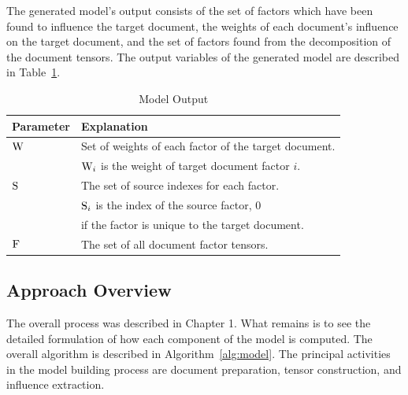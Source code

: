 \documentclass[../ut-dissertation.tex]{subfiles}
\begin{document}
The generated model's output consists of the set of factors which have
been found to influence the target document, the weights of each
document's influence on the target document, and the set of factors
found from the decomposition of the document tensors.  The output variables of
the generated model are described in Table~\ref{table:modelOutput}.
\begin{table}[p]
  \centering
  \caption{Model Output}
  \label{table:modelOutput}

  \begin{tabular}{ll}
    \hline
    Parameter & Explanation\\
    \hline
    $\mathrm{W}$ & Set of weights of each factor of the target document.\\
              & $\mathrm{W}_i$ is the weight of target document factor $i$.\\
    $\mathrm{S}$ & The set of source indexes for each factor.\\
              & $\mathrm{S}_i$ is the index of the source factor, 0 \\
              & if the factor is unique to the target document.\\
    $\mathrm{F}$ & The set of all document factor tensors.\\
    \hline
  \end{tabular}
\end{table}
\FloatBarrier

\subsection{Approach Overview}
The overall process was described in Chapter 1.  What remains is to
see the detailed formulation of how each component of the model is
computed.  The overall algorithm is described in
Algorithm~\ref{alg:model}.  The principal activities in the model
building process are document preparation, tensor construction, and
influence extraction.
\end{document}
